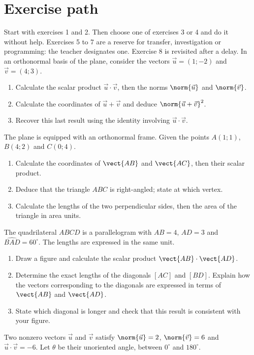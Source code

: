 \section*{Exercise path}\label{C03-PARC}
Start with exercises 1 and 2. Then choose one of exercises 3 or 4 and do it without help. Exercises 5 to 7 are a reserve for transfer, investigation or programming: the teacher designates one. Exercise 8 is revisited after a delay.
\begingroup
{}
In an orthonormal basis of the plane, consider the vectors $\vec u=(1;-2)$ and $\vec v=(4;3)$.
\begin{enumerate}[label=\arabic*.]
\item Calculate the scalar product $\vec u\cdot\vec v$, then the norms $\norm{\vec u}$ and $\norm{\vec v}$.
\item Calculate the coordinates of $\vec u+\vec v$ and deduce $\norm{\vec u+\vec v}^2$.
\item Recover this last result using the identity involving $\vec u\cdot\vec v$.
\end{enumerate}
The plane is equipped with an orthonormal frame. Given the points $A(1;1)$, $B(4;2)$ and $C(0;4)$.
\begin{enumerate}[label=\arabic*.]
\item Calculate the coordinates of $\vect{AB}$ and $\vect{AC}$, then their scalar product.
\item Deduce that the triangle $ABC$ is right-angled; state at which vertex.
\item Calculate the lengths of the two perpendicular sides, then the area of the triangle in area units.
\end{enumerate}
The quadrilateral $ABCD$ is a parallelogram with $AB=4$, $AD=3$ and $\widehat{BAD}=60^\circ$. The lengths are expressed in the same unit.
\begin{enumerate}[label=\arabic*.]
\item Draw a figure and calculate the scalar product $\vect{AB}\cdot\vect{AD}$.
\item Determine the exact lengths of the diagonals $[AC]$ and $[BD]$. Explain how the vectors corresponding to the diagonals are expressed in terms of $\vect{AB}$ and $\vect{AD}$.
\item State which diagonal is longer and check that this result is consistent with your figure.
\end{enumerate}
Two nonzero vectors $\vec u$ and $\vec v$ satisfy $\norm{\vec u}=2$, $\norm{\vec v}=6$ and $\vec u\cdot\vec v=-6$. Let $\theta$ be their unoriented angle, between $0^\circ$ and $180^\circ$.
